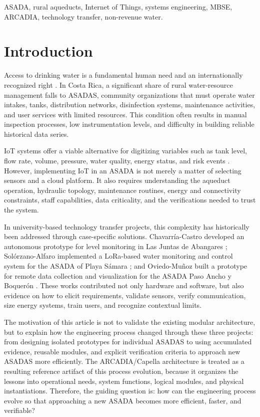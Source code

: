 \documentclass[conference]{IEEEtran}
\begin{document}
\begin{IEEEkeywords}
ASADA, rural aqueducts, Internet of Things, systems engineering, MBSE, ARCADIA, technology transfer, non-revenue water.
\end{IEEEkeywords}

\section{Introduction}
Access to drinking water is a fundamental human need and an internationally recognized right \cite{un_resolution_2010}. In Costa Rica, a significant share of rural water-resource management falls to ASADAS, community organizations that must operate water intakes, tanks, distribution networks, disinfection systems, maintenance activities, and user services with limited resources. This condition often results in manual inspection processes, low instrumentation levels, and difficulty in building reliable historical data series.

IoT systems offer a viable alternative for digitizing variables such as tank level, flow rate, volume, pressure, water quality, energy status, and risk events \cite{6844741}. However, implementing IoT in an ASADA is not merely a matter of selecting sensors and a cloud platform. It also requires understanding the aqueduct operation, hydraulic topology, maintenance routines, energy and connectivity constraints, staff capabilities, data criticality, and the verifications needed to trust the system.

In university-based technology transfer projects, this complexity has historically been addressed through case-specific solutions. Chavarría-Castro developed an autonomous prototype for level monitoring in Las Juntas de Abangares \cite{Chavarria2021}; Solórzano-Alfaro implemented a LoRa-based water monitoring and control system for the ASADA of Playa Sámara \cite{Solorzano2021}; and Oviedo-Muñoz built a prototype for remote data collection and visualization for the ASADA Paso Ancho y Boquerón \cite{Oviedo2024}. These works contributed not only hardware and software, but also evidence on how to elicit requirements, validate sensors, verify communication, size energy systems, train users, and recognize contextual limits.

The motivation of this article is not to validate the existing modular architecture, but to explain how the engineering process changed through these three projects: from designing isolated prototypes for individual ASADAS to using accumulated evidence, reusable modules, and explicit verification criteria to approach new ASADAS more efficiently. The ARCADIA/Capella architecture is treated as a resulting reference artifact of this process evolution, because it organizes the lessons into operational needs, system functions, logical modules, and physical instantiations. Therefore, the guiding question is: how can the engineering process evolve so that approaching a new ASADA becomes more efficient, faster, and verifiable?
\end{document}
